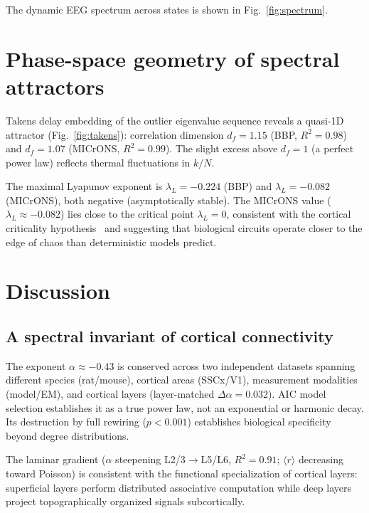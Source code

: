 \documentclass[aps,pre,twocolumn,showpacs,superscriptaddress,longbibliography]{revtex4-2}
\newcommand{\rGOE}{\langle r \rangle}
\newcommand{\kN}{k/N}
\begin{document}
The dynamic EEG spectrum across states is shown in
Fig.~\ref{fig:spectrum}.

\section{\label{sec:phase}Phase-space geometry of spectral attractors}

Takens delay embedding of the outlier eigenvalue sequence reveals
a quasi-1D attractor (Fig.~\ref{fig:takens}): correlation dimension
$d_f = 1.15$ (BBP, $R^2 = 0.98$) and $d_f = 1.07$ (MICrONS,
$R^2 = 0.99$). The slight excess above $d_f=1$ (a perfect power law)
reflects thermal fluctuations in $\kN$.

The maximal Lyapunov exponent is $\lambda_L = -0.224$ (BBP) and
$\lambda_L = -0.082$ (MICrONS), both negative (asymptotically
stable). The MICrONS value ($\lambda_L \approx -0.082$) lies
close to the critical point $\lambda_L = 0$, consistent with
the cortical criticality hypothesis~\cite{Beggs2003,Shew2013}
and suggesting that biological circuits operate closer to the
edge of chaos than deterministic models predict.

\section{\label{sec:discussion}Discussion}

\subsection{A spectral invariant of cortical connectivity}

The exponent $\alpha \approx -0.43$ is conserved across two
independent datasets spanning different species (rat/mouse),
cortical areas (SSCx/V1), measurement modalities (model/EM),
and cortical layers (layer-matched $\Delta\alpha = 0.032$).
AIC model selection establishes it as a true power law, not
an exponential or harmonic decay. Its destruction by full rewiring
($p < 0.001$) establishes biological specificity beyond
degree distributions.

The laminar gradient ($\alpha$ steepening L2/3$\to$L5/L6,
$R^2=0.91$; $\rGOE$ decreasing toward Poisson) is consistent
with the functional specialization of cortical layers: superficial
layers perform distributed associative computation while deep
layers project topographically organized signals subcortically.
\end{document}
